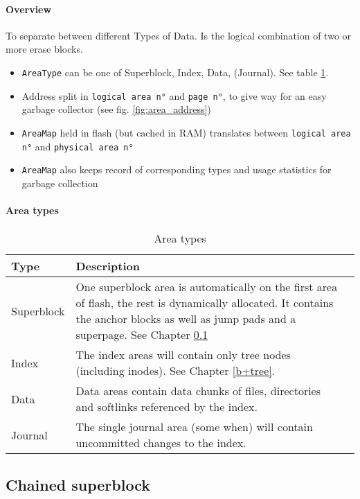 \paragraph{Overview}
To separate between different Types of Data. Is the logical combination of two or more erase blocks.
\begin{itemize}
	\item \texttt{AreaType} can be one of Superblock, Index, Data, (Journal). See table \ref{tab:areatypes}.
	\item Address split in \texttt{logical area n°} and \texttt{page n°}, to give way for an easy garbage collector (see  fig. \ref{fig:area_address})
	\item \texttt{AreaMap} held in flash (but cached in RAM) translates between \texttt{logical area n°} and \texttt{physical area n°}
	\item \texttt{AreaMap} also keeps record of corresponding types and usage statistics for garbage collection
\end{itemize}

\paragraph{Area types}
\begin{table}[htbp]
\caption{Area types}
\label{tab:areatypes}
\begin{tabularx}{\textwidth}{lp{11cm}p{2.5cm}}
\toprule
Type & Description\\
\midrule
Superblock & One superblock area is automatically on the first area of flash, the rest is dynamically allocated. It contains the anchor blocks as well as jump pads and a superpage. See Chapter \ref{chainedSB} \\
Index & The index areas will contain only tree nodes (including inodes). See Chapter \ref{b+tree}.\\
Data & Data areas contain data chunks of files, directories and softlinks referenced by the index.\\
Journal & The single journal area (some when) will contain uncommitted changes to the index.\\
\bottomrule
\end{tabularx}
\end{table} 

\subsection{Chained superblock}
\label{chainedSB}
